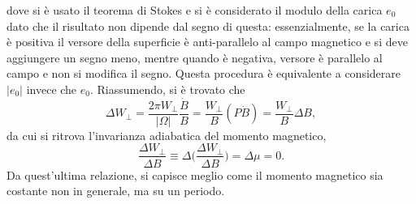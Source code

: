 dove si è usato il teorema di Stokes e si è considerato il modulo della carica $e_0$ dato che il risultato non dipende dal segno di questa: essenzialmente, se la carica è positiva il versore della superficie è anti-parallelo al campo magnetico e si deve aggiungere un segno meno, mentre quando è negativa, versore è parallelo al campo e non si modifica il segno. Questa procedura è equivalente a considerare $|e_0|$ invece che $e_0$. Riassumendo, si è trovato che 
\begin{equation}
    \Delta W_\perp = \frac{2\pi W_\perp}{|\Omega|}\frac{\dot{B}}{B} = \frac{W_\perp}{B}(P\dot{B}) = \frac{W_\perp}{B}\Delta B,
\end{equation}
da cui si ritrova l'invarianza adiabatica del momento magnetico,
\begin{equation}
\label{eq: Delta mu = Delta W_perp/Delta B}
    \frac{\Delta W_\perp}{\Delta B} \equiv \Delta\bigg(\frac{\Delta W_\perp}{\Delta B}\bigg) = \Delta \mu = 0.
\end{equation}
Da quest'ultima relazione, si capisce meglio come il momento magnetico sia costante non in generale, ma su un periodo. 

